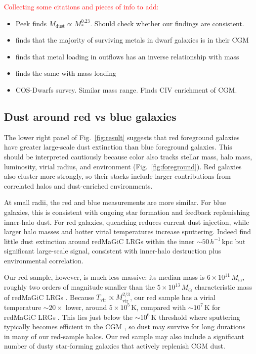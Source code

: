 \documentclass[linenumbers, twocolumn]{aastex701}
\newcommand{\note}[1]{\textcolor{red}{#1}}
\begin{document}
\note{Collecting some citations and pieces of info to add:}
\begin{itemize}
    \item Peek finds $M_\text{dust} \propto M_*^{0.23}$. Should check whether our findings are consistent.
    \item \citet{zheng2024} finds that the majority of surviving metals in dwarf galaxies is in their CGM
    \item \citet{chisholm2018} finds that metal loading in outflows has an inverse relationship with mass
    \item \citet{chisholm2017} finds the same with mass loading
    \item \citet{bordoloi2014} COS-Dwarfs survey. Similar mass range. Finds CIV enrichment of CGM.
\end{itemize}

\subsection{Dust around red vs blue galaxies}

The lower right panel of Fig.~\ref{fig:result} suggests that red foreground galaxies have greater large-scale dust extinction than blue foreground galaxies.
This should be interpreted cautiously because color also tracks stellar mass, halo mass, luminosity, virial radius, and environment (Fig.~\ref{fig:foreground}).
Red galaxies also cluster more strongly, so their stacks include larger contributions from correlated halos and dust-enriched environments.

At small radii, the red and blue measurements are more similar.
For blue galaxies, this is consistent with ongoing star formation and feedback replenishing inner-halo dust.
For red galaxies, quenching reduces current dust injection, while larger halo masses and hotter virial temperatures increase sputtering.
Indeed \citet{mccleary2025} find little dust extinction around redMaGiC LRGs within the inner $\sim50\,h^{-1}$\,kpc but significant large-scale signal, consistent with inner-halo destruction plus environmental correlation.

Our red sample, however, is much less massive: its median mass is $6 \times 10^{11}\,M_\odot$, roughly two orders of magnitude smaller than the $5 \times 10^{13}\,M_\odot$ characteristic mass of redMaGiC LRGs \citep{zacharegkas2022}.
Because $T_\text{vir} \propto M_\text{vir}^{2/3}$, our red sample has a virial temperature $\sim 20\times$ lower, around $5 \times 10^5$\,K, compared with $\sim 10^7$\,K for redMaGiC LRGs \citep{barkana2001}.
This lies just below the $\sim10^6$\,K threshold where sputtering typically becomes efficient in the CGM \citep{richie2024}, so dust may survive for long durations in many of our red-sample halos.
Our red sample may also include a significant number of dusty star-forming galaxies that actively replenish CGM dust.
\end{document}
